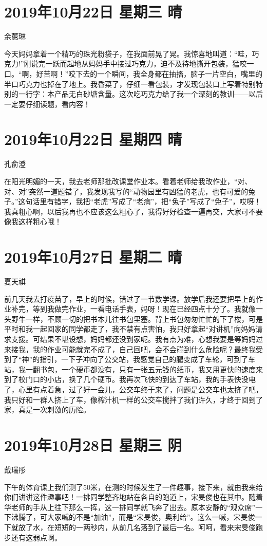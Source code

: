 \section{2019年10月22日 星期三 晴}

余蕙琳

今天妈妈拿着一个精巧的珠光粉袋子，在我面前晃了晃。我惊喜地叫道：``哇，巧克力!''刚说完一跃而起地从妈妈手中接过巧克力，迫不及待地撕开包装，猛咬一口。``啊，好苦啊！''咬下去的一个瞬间，我全身都在抽搐，脑子一片空白，嘴里的半口巧克力也掉在了地上。我昏菜了，仔细一看包装，才发现包装口上写着特别特别的一行字：本产品无白砂塘含量。这次吃巧克力给了我一个深刻的教训------以后一定要仔细读题，看内容！

\section{2019年10月22日 星期四 晴}

孔俞澄

在阳光明媚的一天，我去老师那批改课堂作业本。看着老师给我改作业，``对、对、对''突然一道题错了，我发现我写的``动物园里有凶猛的老虎，也有可爱的兔子。''这句话里有错字，我把``老虎''写成了``老病''，把``兔子''写成了``免子''，哎呀！我真粗心啊，以后我再也不应该这么粗心了，我得好好检查一遍再交，大家可不要像我这样粗心哦！

\section{2019年10月27日 星期二 晴}

夏天祺

前几天我去打疫苗了，早上的时候，错过了一节数学课。放学后我还要把早上的作业补完，等到我做完作业，一看电话手表，妈呀！现在已经四点十分了。我就像一头野牛一样，不顾一切的把书本儿往书包里塞。背上书包匆匆忙忙的下了楼，可是平时和我一起回家的同学都走了，我不禁有点害怕，我只好拿起``对讲机''向妈妈请求支援。可结果不堪设想，妈妈都还没到家呢。我有点为难，心想我要是等妈妈过来接我，我的作业可能就完不成了，自己回吧，会不会碰到什么危险呢？最终我受到了``神''的指引，一下子冲向了公交站，我感觉自己的腿变成了车轮，可到了车站，我一翻书包，一个硬币都没有，只有一张五元钱的纸币，我又用更快的速度来到了校门口的小店，换了几个硬币。我再次飞快的到达了车站，我的手表快没电了，心里有点着急，过了好一会儿，公交车终于来了，问题是公交车也太挤了吧，我只好和一群人挤上了车，像榨汁机一样的公交车搅拌了我们许久，才终于回到了家，真是一次刺激的历险。

\section{2019年10月28日 星期三 阴}

戴瑞彤

下午的体育课上我们测了50米，在测的时候发生了一件趣事，接下来，就由我来给你们讲讲这件趣事吧！一排同学整齐地站在各自的跑道上，宋旻俊也在其中。随着华老师的手从上往下那么一挥，这一排同学就飞奔了出去。原本安静的``观众席''一下沸腾了，可大家喊的不是``加油''，而是``宋旻俊，奥利给''。这么一喊，宋旻俊一下就放了水，在短短的一两秒内，从前几名落到了最后一名。呵呵，看来宋旻俊跑步还有这弱点啊。
